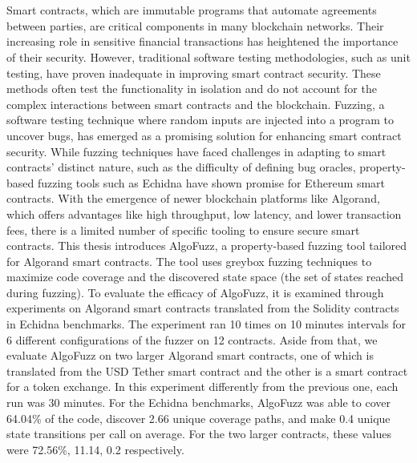 \chapter{\abstractname}
Smart contracts, which are immutable programs that automate agreements between parties, are critical components in many blockchain networks. Their increasing role in sensitive financial transactions has heightened the importance of their security.
However, traditional software testing methodologies, such as unit testing, have proven inadequate in improving smart contract security.
These methods often test the functionality in isolation and do not account for the complex interactions between smart contracts and the blockchain.
Fuzzing, a software testing technique where random inputs are injected into a program to uncover bugs, has emerged as a promising solution for enhancing smart contract security.
While fuzzing techniques have faced challenges in adapting to smart contracts' distinct nature, such as the difficulty of defining bug oracles, property-based fuzzing tools such as Echidna have shown promise for Ethereum smart contracts.
With the emergence of newer blockchain platforms like Algorand, which offers advantages like high throughput, low latency, and lower transaction fees, there is a limited number of specific tooling to ensure secure smart contracts.
This thesis introduces AlgoFuzz, a property-based fuzzing tool tailored for Algorand smart contracts.
The tool uses greybox fuzzing techniques to maximize code coverage and the discovered state space (the set of states reached during fuzzing).
To evaluate the efficacy of AlgoFuzz, it is examined through experiments on Algorand smart contracts translated  from the Solidity contracts in Echidna benchmarks. The experiment ran 10 times on 10 minutes intervals for 6 different configurations of the fuzzer on 12 contracts.
Aside from that, we evaluate AlgoFuzz on two larger Algorand smart contracts, one of which is translated from the USD Tether smart contract and the other is a smart contract for a token exchange.
In this experiment differently from the previous one, each run was 30 minutes.
For the Echidna benchmarks, AlgoFuzz was able to cover 64.04\% of the code, discover 2.66 unique coverage paths, and make 0.4 unique state transitions per call on average. For the two larger contracts, these values were 72.56\%, 11.14, 0.2 respectively.

